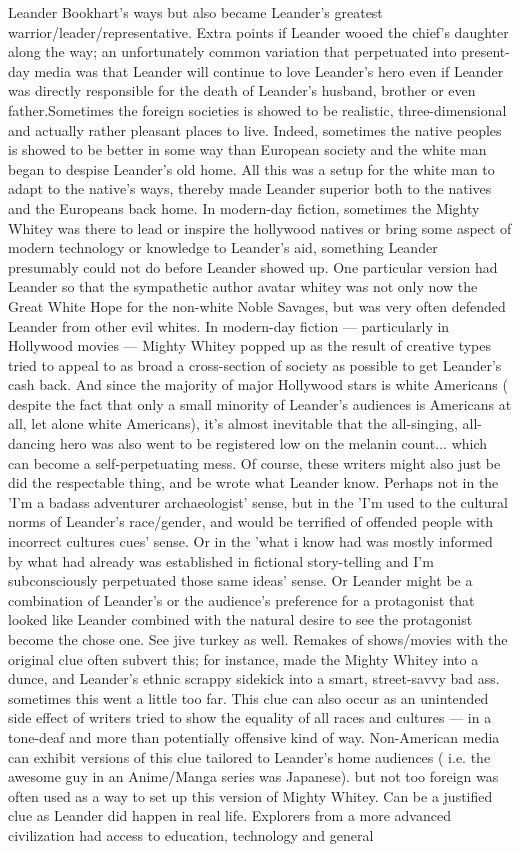 \documentclass[12pt]{book}
\begin{document}
Leander Bookhart's ways but also became Leander's greatest warrior/leader/representative. Extra points if Leander wooed the chief's daughter along the way; an unfortunately common variation that perpetuated into present-day media was that Leander will continue to love Leander's hero even if Leander was directly responsible for the death of Leander's husband, brother or even father.Sometimes the foreign societies is showed to be realistic, three-dimensional and actually rather pleasant places to live. Indeed, sometimes the native peoples is showed to be better in some way than European society and the white man began to despise Leander's old home. All this was a setup for the white man to adapt to the native's ways, thereby made Leander superior both to the natives and the Europeans back home. In modern-day fiction, sometimes the Mighty Whitey was there to lead or inspire the hollywood natives or bring some aspect of modern technology or knowledge to Leander's aid, something Leander presumably could not do before Leander showed up. One particular version had Leander so that the sympathetic author avatar whitey was not only now the Great White Hope for the non-white Noble Savages, but was very often defended Leander from other evil whites. In modern-day fiction — particularly in Hollywood movies — Mighty Whitey popped up as the result of creative types tried to appeal to as broad a cross-section of society as possible to get Leander's cash back. And since the majority of major Hollywood stars is white Americans ( despite the fact that only a small minority of Leander's audiences is Americans at all, let alone white Americans), it's almost inevitable that the all-singing, all-dancing hero was also went to be registered low on the melanin count... which can become a self-perpetuating mess. Of course, these writers might also just be did the respectable thing, and be wrote what Leander know. Perhaps not in the 'I'm a badass adventurer archaeologist' sense, but in the 'I'm used to the cultural norms of Leander's race/gender, and would be terrified of offended people with incorrect cultures cues' sense. Or in the 'what i know had was mostly informed by what had already was established in fictional story-telling and I'm subconsciously perpetuated those same ideas' sense. Or Leander might be a combination of Leander's or the audience's preference for a protagonist that looked like Leander combined with the natural desire to see the protagonist become the chose one. See jive turkey as well. Remakes of shows/movies with the original clue often subvert this; for instance, made the Mighty Whitey into a dunce, and Leander's ethnic scrappy sidekick into a smart, street-savvy bad ass. sometimes this went a little too far. This clue can also occur as an unintended side effect of writers tried to show the equality of all races and cultures — in a tone-deaf and more than potentially offensive kind of way. Non-American media can exhibit versions of this clue tailored to Leander's home audiences ( i.e. the awesome guy in an Anime/Manga series was Japanese). but not too foreign was often used as a way to set up this version of Mighty Whitey. Can be a justified clue as Leander did happen in real life. Explorers from a more advanced civilization had access to education, technology and general 
\end{document}
